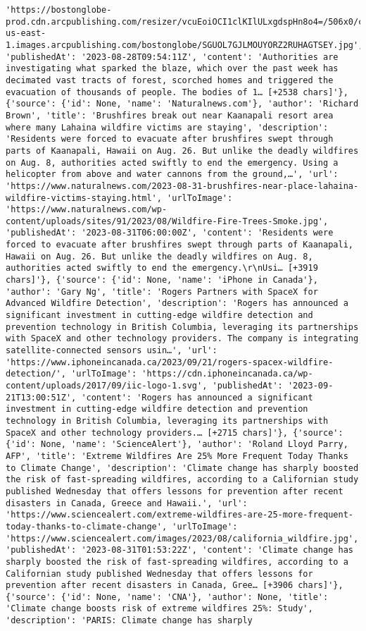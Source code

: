 \documentclass[
  letterpaper,
  DIV=11,
  numbers=noendperiod]{scrartcl}
\begin{document}
\begin{verbatim}
'https://bostonglobe-prod.cdn.arcpublishing.com/resizer/vcuEoiOCI1clKIlULxgdspHn8o4=/506x0/cloudfront-us-east-1.images.arcpublishing.com/bostonglobe/SGUOL7GJLMOUYORZ2RUHAGTSEY.jpg', 'publishedAt': '2023-08-28T09:54:11Z', 'content': 'Authorities are investigating what sparked the blaze, which over the past week has decimated vast tracts of forest, scorched homes and triggered the evacuation of thousands of people. The bodies of 1… [+2538 chars]'}, {'source': {'id': None, 'name': 'Naturalnews.com'}, 'author': 'Richard Brown', 'title': 'Brushfires break out near Kaanapali resort area where many Lahaina wildfire victims are staying', 'description': 'Residents were forced to evacuate after brushfires swept through parts of Kaanapali, Hawaii on Aug. 26. But unlike the deadly wildfires on Aug. 8, authorities acted swiftly to end the emergency. Using a helicopter from above and water cannons from the ground,…', 'url': 'https://www.naturalnews.com/2023-08-31-brushfires-near-place-lahaina-wildfire-victims-staying.html', 'urlToImage': 'https://www.naturalnews.com/wp-content/uploads/sites/91/2023/08/Wildfire-Fire-Trees-Smoke.jpg', 'publishedAt': '2023-08-31T06:00:00Z', 'content': 'Residents were forced to evacuate after brushfires swept through parts of Kaanapali, Hawaii on Aug. 26. But unlike the deadly wildfires on Aug. 8, authorities acted swiftly to end the emergency.\r\nUsi… [+3919 chars]'}, {'source': {'id': None, 'name': 'iPhone in Canada'}, 'author': 'Gary Ng', 'title': 'Rogers Partners with SpaceX for Advanced Wildfire Detection', 'description': 'Rogers has announced a significant investment in cutting-edge wildfire detection and prevention technology in British Columbia, leveraging its partnerships with SpaceX and other technology providers. The company is integrating satellite-connected sensors usin…', 'url': 'https://www.iphoneincanada.ca/2023/09/21/rogers-spacex-wildfire-detection/', 'urlToImage': 'https://cdn.iphoneincanada.ca/wp-content/uploads/2017/09/iic-logo-1.svg', 'publishedAt': '2023-09-21T13:00:51Z', 'content': 'Rogers has announced a significant investment in cutting-edge wildfire detection and prevention technology in British Columbia, leveraging its partnerships with SpaceX and other technology providers.… [+2715 chars]'}, {'source': {'id': None, 'name': 'ScienceAlert'}, 'author': 'Roland Lloyd Parry, AFP', 'title': 'Extreme Wildfires Are 25% More Frequent Today Thanks to Climate Change', 'description': 'Climate change has sharply boosted the risk of fast-spreading wildfires, according to a Californian study published Wednesday that offers lessons for prevention after recent disasters in Canada, Greece and Hawaii.', 'url': 'https://www.sciencealert.com/extreme-wildfires-are-25-more-frequent-today-thanks-to-climate-change', 'urlToImage': 'https://www.sciencealert.com/images/2023/08/california_wildfire.jpg', 'publishedAt': '2023-08-31T01:53:22Z', 'content': 'Climate change has sharply boosted the risk of fast-spreading wildfires, according to a Californian study published Wednesday that offers lessons for prevention after recent disasters in Canada, Gree… [+3906 chars]'}, {'source': {'id': None, 'name': 'CNA'}, 'author': None, 'title': 'Climate change boosts risk of extreme wildfires 25%: Study', 'description': 'PARIS: Climate change has sharply 
\end{verbatim}
\end{document}
